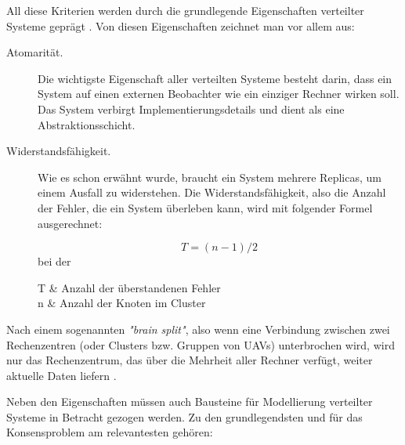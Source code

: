 All diese Kriterien werden durch die grundlegende Eigenschaften verteilter Systeme geprägt \cite{Chandra96unreliablefailure}. Von diesen Eigenschaften zeichnet man vor allem aus:


\begin{description} 
	\item[Atomarität.] Die wichtigste Eigenschaft aller verteilten Systeme besteht darin, dass ein System auf einen externen Beobachter wie ein einziger Rechner wirken soll. Das System verbirgt Implementierungsdetails und dient als eine Abstraktionsschicht.
	
	\item[Widerstandsfähigkeit.] Wie es schon erwähnt wurde, braucht ein System mehrere Replicas, um einem Ausfall zu widerstehen. Die Widerstandsfähigkeit, also die Anzahl der Fehler, die ein System überleben kann, wird mit folgender Formel ausgerechnet:
	
	\[
	T = (n - 1) / 2
	\]
	bei der
	\begin{conditions*}
		T  &  Anzahl der überstandenen Fehler \\
		n  &  Anzahl der Knoten im Cluster \\
	\end{conditions*}
\end{description}

Nach einem sogenannten \textit{"brain split"}, also wenn eine Verbindung zwischen zwei Rechenzentren (oder Clusters bzw. Gruppen von UAVs) unterbrochen wird, wird nur das Rechenzentrum, das über die Mehrheit aller Rechner verfügt, weiter aktuelle Daten liefern \cite{Chandra96unreliablefailure}.

Neben den Eigenschaften müssen auch Bausteine für Modellierung verteilter Systeme in Betracht gezogen werden. Zu den grundlegendsten und für das Konsensproblem am relevantesten gehören:

